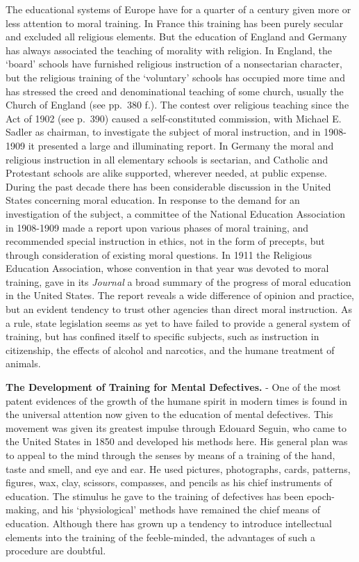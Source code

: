 \documentclass[
]{book}
\begin{document}
The educational systems of Europe have for a quarter of a century given more or less attention to moral training. In France this training has been purely secular and excluded all religious elements. But the education of England and Germany has always associated the teaching of morality with religion. In England, the `board' schools have furnished religious instruction of a nonsectarian character, but the religious training of the `voluntary' schools has occupied more time and has stressed the creed and denominational teaching of some church, usually the Church of England (see pp.~380 f.). The contest over religious teaching since the Act of 1902 (see p.~390) caused a self-constituted commission, with Michael E. Sadler as chairman, to investigate the subject of moral instruction, and in 1908-1909 it presented a large and illuminating report. In Germany the moral and religious instruction in all elementary schools is sectarian, and Catholic and Protestant schools are alike supported, wherever needed, at public expense. During the past decade there has been considerable discussion in the United States concerning moral education. In response to the demand for an investigation of the subject, a committee of the National Education Association in 1908-1909 made a report upon various phases of moral training, and recommended special instruction in ethics, not in the form of precepts, but through consideration of existing moral questions. In 1911 the Religious Education Association, whose convention in that year was devoted to moral training, gave in its \emph{Journal} a broad summary of the progress of moral education in the United States. The report reveals a wide difference of opinion and practice, but an evident tendency to trust other agencies than direct moral instruction. As a rule, state legislation seems as yet to have failed to provide a general system of training, but has confined itself to specific subjects, such as instruction in citizenship, the effects of alcohol and narcotics, and the humane treatment of animals.

\textbf{The Development of Training for Mental Defectives.} - One of the most patent evidences of the growth of the humane spirit in modern times is found in the universal attention now given to the education of mental defectives. This movement was given its greatest impulse through Edouard Seguin, who came to the United States in 1850 and developed his methods here. His general plan was to appeal to the mind through the senses by means of a training of the hand, taste and smell, and eye and ear. He used pictures, photographs, cards, patterns, figures, wax, clay, scissors, compasses, and pencils as his chief instruments of education. The stimulus he gave to the training of defectives has been epoch-making, and his `physiological' methods have remained the chief means of education. Although there has grown up a tendency to introduce intellectual elements into the training of the feeble-minded, the advantages of such a procedure are doubtful.
\end{document}
